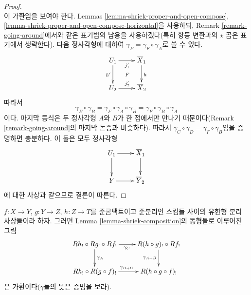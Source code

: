 \begin{proof}
$${}
$$
이 가환임을 보여야 한다.
Lemmas \ref{lemma-shriek-proper-and-open-compose},
\ref{lemma-shriek-proper-and-open-compose-horizontal}을 사용하되,
Remark \ref{remark-going-around}에서와 같은 표기법의 남용을
사용하겠다(특히 항등 변환과의 $\star$ 곱은 표기에서 생략한다).
다음 정사각형에 대하여 $\gamma_E = \gamma_F \circ \gamma_A$로
쓸 수 있다.
$$
\xymatrix{
U_1 \ar[r]_{j'_1} \ar[d]_{h'} \ar@{}[rd]|F &
\overline{X}_1 \ar[d]^h \\
U_2 \ar[r]^{j'_2} &
\overline{X}_2
}
$$
따라서
$$
\gamma_E \circ \gamma_B = \gamma_F \circ \gamma_A  \circ \gamma_B
= \gamma_F \circ \gamma_B \circ \gamma_A
$$
이다. 마지막 등식은 두 정사각형 $A$와 $B$가 한 점에서만 만나기
때문이다(Remark \ref{remark-going-around}의 마지막 논증과 비슷하다).
따라서 $\gamma_C \circ \gamma_D = \gamma_F \circ \gamma_B$임을
증명하면 충분하다. 이 둘은 모두 정사각형
$$
\xymatrix{
U_1 \ar[r] \ar[d] & \overline{X}_1 \ar[d] \\
Y \ar[r] & \overline{Y}_2
}
$$
에 대한 사상과 같으므로 결론이 따른다.
\end{proof}


\begin{lemma}
\label{lemma-pseudo-functor}
$f : X \to Y$, $g : Y \to Z$, $h : Z \to T$를 준콤팩트이고
준분리인 스킴들 사이의 유한형 분리 사상들이라 하자.
그러면 Lemma \ref{lemma-shriek-composition}의 동형들로 이루어진 그림
$$
\xymatrix{
Rh_! \circ Rg_! \circ Rf_! \ar[r]_{\gamma_C} \ar[d]^{\gamma_A} &
R(h \circ g)_! \circ Rf_! \ar[d]_{\gamma_{A + B}} \\
Rh_! \circ R(g \circ f)_! \ar[r]^{\gamma_{B + C}} &
R(h \circ g \circ f)_!
}
$$
은 가환이다($\gamma$들의 뜻은 증명을 보라).
\end{lemma}

